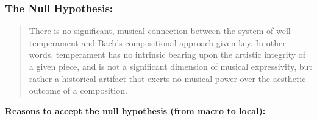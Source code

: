 \subsubsection{The Null Hypothesis:}\label{the-null-hypothesis}

\begin{quote}
There is no significant, musical connection between the system of
well-temperament and Bach's compositional approach given key. In other
words, temperament has no intrinsic bearing upon the artistic integrity
of a given piece, and is not a significant dimension of musical
expressivity, but rather a historical artifact that exerts no musical
power over the aesthetic outcome of a composition.
\end{quote}

\textbf{Reasons to accept the null hypothesis (from macro to local):}

